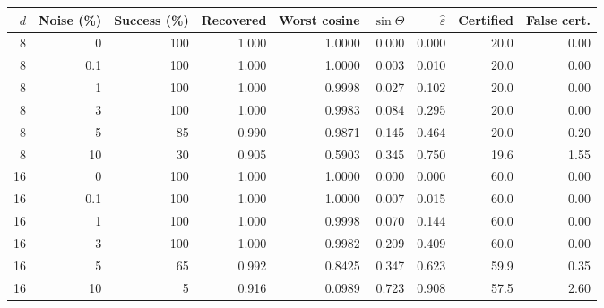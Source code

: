 \begin{tabular}{r r r r r r r r r}
\toprule
$d$ & Noise (\%) & Success (\%) & Recovered & Worst cosine & $\sin\Theta$ & $\hat\varepsilon$ & Certified & False cert.\\
\midrule
8 & 0 & 100 & 1.000 & 1.0000 & 0.000 & 0.000 & 20.0 & 0.00 \\
8 & 0.1 & 100 & 1.000 & 1.0000 & 0.003 & 0.010 & 20.0 & 0.00 \\
8 & 1 & 100 & 1.000 & 0.9998 & 0.027 & 0.102 & 20.0 & 0.00 \\
8 & 3 & 100 & 1.000 & 0.9983 & 0.084 & 0.295 & 20.0 & 0.00 \\
8 & 5 & 85 & 0.990 & 0.9871 & 0.145 & 0.464 & 20.0 & 0.20 \\
8 & 10 & 30 & 0.905 & 0.5903 & 0.345 & 0.750 & 19.6 & 1.55 \\
16 & 0 & 100 & 1.000 & 1.0000 & 0.000 & 0.000 & 60.0 & 0.00 \\
16 & 0.1 & 100 & 1.000 & 1.0000 & 0.007 & 0.015 & 60.0 & 0.00 \\
16 & 1 & 100 & 1.000 & 0.9998 & 0.070 & 0.144 & 60.0 & 0.00 \\
16 & 3 & 100 & 1.000 & 0.9982 & 0.209 & 0.409 & 60.0 & 0.00 \\
16 & 5 & 65 & 0.992 & 0.8425 & 0.347 & 0.623 & 59.9 & 0.35 \\
16 & 10 & 5 & 0.916 & 0.0989 & 0.723 & 0.908 & 57.5 & 2.60 \\
\bottomrule
\end{tabular}
